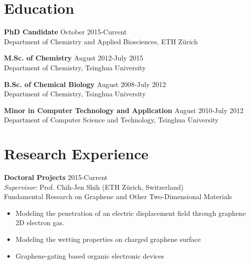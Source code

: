 \documentclass[margin]{res}
\begin{document}


\address{ HCI E120 \\
          Vladimir-Prelog-Weg 1/5 \\
          ETH Z\"{u}rich, CH-8093, Z\"{u}rich, Switzerland \\
          +41-44-63-37330 \\
          Mail: tian.tian@chem.ethz.ch}
\address{{} \\  \\  \\
        }

\begin{resume}


\section{Education}

\textbf{PhD Candidate} \hfill October 2015-Current\\
Department of Chemistry and Applied Biosciences, ETH Z\"{u}rich

\textbf{M.Sc. of Chemistry}  \hfill August 2012-July 2015\\
Department of Chemistry, Tsinghua University

\textbf{B.Sc. of Chemical Biology}  \hfill August 2008-July 2012\\
Department of Chemistry, Tsinghua University

\textbf{Minor in Computer Technology and Application}  \hfill August 2010-July 2012\\
Department of Computer Science and Technology, Tsinghua University

\section{Research Experience}
\textbf{Doctoral Projects} \hfill 2015-Current\\
\textit{Supervisor}: Prof. Chih-Jen Shih (ETH Z\"{u}rich, Switzerland)\\
Fundamental Research on Graphene and Other Two-Dimensional Materials
\begin{itemize} \itemsep -2pt
  \item Modeling the penetration of an electric displacement field through graphene 2D electron gas.
  \item Modeling the wetting properties on charged graphene surface
  \item Graphene-gating based organic electronic devices
\end{itemize}


\end{resume}
\end{document}
